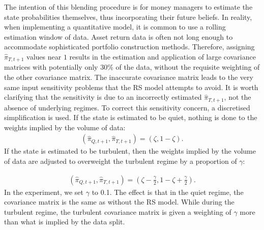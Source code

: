 \documentclass[
]{article}
\begin{document}
The intention of this blending procedure is for money managers to estimate the state probabilities
themselves, thus incorporating their future beliefs. In reality, when implementing a quantitative
model, it is common to use a rolling estimation window of data. Asset return data is often not long
enough to accommodate sophisticated portfolio construction methods. Therefore, assigning
\(\hat{\pi}_{T, t + 1}\) values near \(1\) results in the estimation and application of large covariance
matrices with potentially only \(30 \%\) of the data, without the requisite weighting of the other
covariance matrix. The inaccurate covariance matrix leads to the very same input sensitivity problems
that the RS model attempts to avoid. It is worth clarifying that the sensitivity is due to an
incorrectly estimated \(\hat{\pi}_{T, t + 1}\), not the absence of underlying regimes. To correct this
sensitivity concern, a discretised simplification is used. If the state is estimated to be quiet,
nothing is done to the weights implied by the volume of data:
\begin{align*}
(\hat{\pi}_{Q, t + 1}, \hat{\pi}_{T, t + 1}) = (\zeta, 1 - \zeta).
\end{align*}
If the state is estimated to be turbulent, then the weights implied by the volume of data are adjusted
to overweight the turbulent regime by a proportion of \(\gamma\):

\begin{align*}
(\hat{\pi}_{Q, t + 1}, \hat{\pi}_{T, t + 1}) = (\zeta -  \frac{\gamma}{2}, 1 - \zeta + \frac{\gamma}{2}).
\end{align*}
In the experiment, we set \(\gamma\) to 0.1. The effect is that in the quiet regime, the covariance
matrix is the same as without the RS model. While during the turbulent regime, the turbulent covariance
matrix is given a weighting of \(\gamma\) more than what is implied by the data split.
\end{document}
